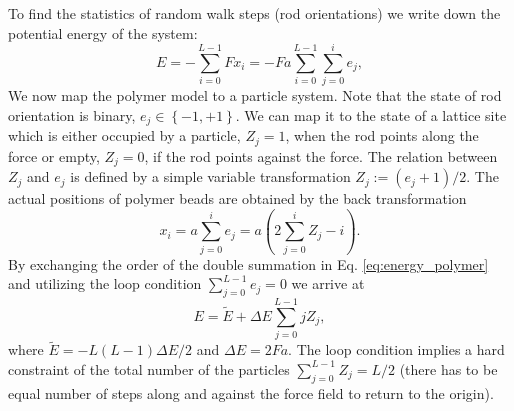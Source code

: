 \documentclass[aps,showpacs,twocolumn,floatfix,prx,superscriptaddress]{revtex4-1}
\begin{document}
To find the statistics of random walk steps (rod orientations) we write down the potential energy of the system:
\begin{equation}
    \label{eq:energy_polymer}
    E  = -\sum_{i=0}^{L-1} {Fx_i} = -Fa\sum_{i=0}^{L-1} \sum_{j=0}^{i}e_j, 
\end{equation}
We now map the polymer model to a particle system. Note that the state of rod
orientation is binary, $e_j \in \left\{-1, +1\right\}$. We can map it to the state of a
lattice site which is either occupied by a particle, $Z_j = 1$, when the rod points along the force
or empty, $Z_j = 0$, if the rod points against the force. The relation between $Z_j$ and $e_j$ is defined by a simple
variable transformation $Z_j := \left(e_j+1\right)/2$. The actual positions of polymer
beads are obtained by the back transformation
\begin{equation}
    \label{eq:z2x}
    x_i = a \sum_{j=0}^{i}{e_j} = a\left(2\sum_{j=0}^{i}{Z_j} -i\right).
\end{equation}
By exchanging the order of the double summation in Eq.
\eqref{eq:energy_polymer} and utilizing the loop condition  $\sum_{j=0}^{L-1} e_j = 0$ we 
arrive at 
\begin{equation}
    \label{eq:energy_particle}
    E = \tilde{E} + \Delta E \sum_{j=0}^{L-1} j Z_j, 
\end{equation}
where $\tilde{E}= - L(L-1) \Delta E /2$ and $\Delta E = 2Fa$. The loop condition
implies a hard constraint of the total number of the particles
$\sum_{j=0}^{L-1} Z_j = L/2$ (there has to be equal number of steps along and against the force field to return to the origin).
\end{document}
